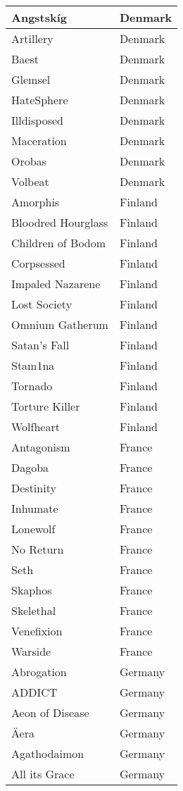\documentclass[12pt, a4paper, twoside]{report}
\begin{document}
\begin{center}
\begin{longtable}{|p{5cm}|p{5cm}|}
Angstskíg & Denmark \\ \hline
Artillery & Denmark \\ \hline
Baest & Denmark \\ \hline
Glemsel & Denmark \\ \hline
HateSphere & Denmark \\ \hline
Illdisposed & Denmark \\ \hline
Maceration & Denmark \\ \hline
Orobas & Denmark \\ \hline
Volbeat & Denmark \\ \hline
Amorphis & Finland \\ \hline
Bloodred Hourglass & Finland \\ \hline
Children of Bodom & Finland \\ \hline
Corpsessed & Finland \\ \hline
Impaled Nazarene & Finland \\ \hline
Lost Society & Finland \\ \hline
Omnium Gatherum & Finland \\ \hline
Satan's Fall & Finland \\ \hline
Stam1na & Finland \\ \hline
Tornado & Finland \\ \hline
Torture Killer & Finland \\ \hline
Wolfheart & Finland \\ \hline
Antagonism & France \\ \hline
Dagoba & France \\ \hline
Destinity & France \\ \hline
Inhumate & France \\ \hline
Lonewolf & France \\ \hline
No Return & France \\ \hline
Seth & France \\ \hline
Skaphos & France \\ \hline
Skelethal & France \\ \hline
Venefixion & France \\ \hline
Warside & France \\ \hline
Abrogation & Germany \\ \hline
ADDICT & Germany \\ \hline
Aeon of Disease & Germany \\ \hline
Äera & Germany \\ \hline
Agathodaimon & Germany \\ \hline
All its Grace & Germany \\ \hline

\end{longtable}
\end{center}
\end{document}
